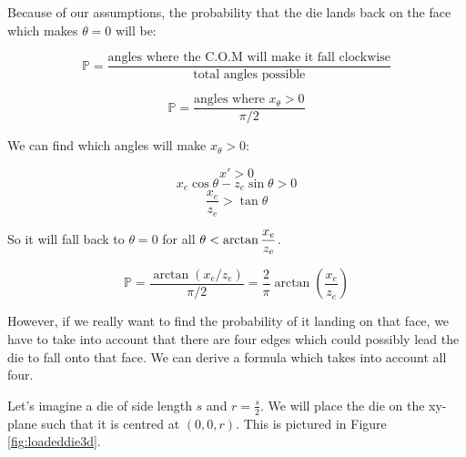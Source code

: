 \documentclass[english,12pt,a4paper,final]{article}
\begin{document}
Because of our assumptions, the probability that the die lands back on the face which makes $\theta = 0$ will be:

\begin{equation*}
	\mathbb{P} = \frac{\text{angles where the C.O.M will make it fall clockwise}}{\text{total angles possible}}
\end{equation*}

\begin{equation*}
	 \mathbb{P} = \frac{\text{angles where $x_{\theta} > 0$}}{\pi/2}
\end{equation*}

We can find which angles will make $x_{\theta} > 0$:

\begin{equation*}
	x' > 0
\end{equation*}
\begin{equation*}
	x_e\cos\theta - z_e\sin\theta > 0
\end{equation*}
\begin{equation*}
	\frac{x_e}{z_e} > \tan\theta
\end{equation*}

So it will fall back to $\theta=0$ for all $\theta < \arctan\mathlarger{\frac{x_e}{z_e}}$.

\begin{equation}\label{dieEdgeProb}
	\mathbb{P} = \frac{\arctan(x_e/z_e)}{\pi/2} = \frac{2}{\pi} \arctan\left(\frac{x_e}{z_e}\right)
\end{equation}

However, if we really want to find the probability of it landing on that face, we have to take into account that there are four edges which could possibly lead the die to fall onto that face. We can derive a formula which takes into account all four.

Let's imagine a die of side length $s$ and $r=\frac{s}{2}$. We will place the die on the xy-plane such that it is centred at $(0, 0, r)$. This is pictured in Figure \ref{fig:loadeddie3d}.
\end{document}
